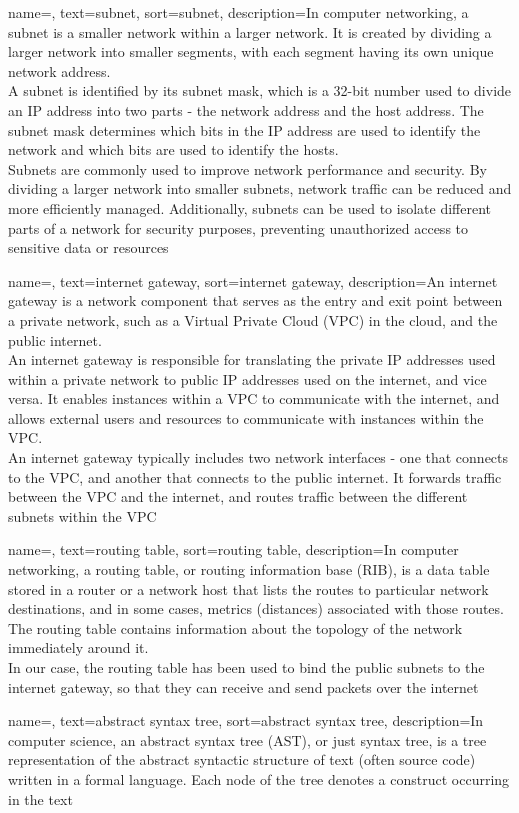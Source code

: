 {
    name=,
    text=subnet,
    sort=subnet,
    description={In computer networking, a subnet is a smaller network within a larger network. It is created by dividing a larger network into smaller segments, with each segment having its own unique network address.\\
    A subnet is identified by its subnet mask, which is a 32-bit number used to divide an IP address into two parts - the network address and the host address. The subnet mask determines which bits in the IP address are used to identify the network and which bits are used to identify the hosts.\\
    Subnets are commonly used to improve network performance and security. By dividing a larger network into smaller subnets, network traffic can be reduced and more efficiently managed. Additionally, subnets can be used to isolate different parts of a network for security purposes, preventing unauthorized access to sensitive data or resources}
}

{
    name=,
    text=internet gateway,
    sort=internet gateway,
    description={An internet gateway is a network component that serves as the entry and exit point between a private network, such as a Virtual Private Cloud (VPC) in the cloud, and the public internet.\\
    An internet gateway is responsible for translating the private IP addresses used within a private network to public IP addresses used on the internet, and vice versa. It enables instances within a VPC to communicate with the internet, and allows external users and resources to communicate with instances within the VPC.\\    
    An internet gateway typically includes two network interfaces - one that connects to the VPC, and another that connects to the public internet. It forwards traffic between the VPC and the internet, and routes traffic between the different subnets within the VPC}
}

{
    name=,
    text=routing table,
    sort=routing table,
    description={In computer networking, a routing table, or routing information base (RIB), is a data table stored in a router or a network host that lists the routes to particular network destinations, and in some cases, metrics (distances) associated with those routes. The routing table contains information about the topology of the network immediately around it.\\
    In our case, the routing table has been used to bind the public subnets to the internet gateway, so that they can receive and send packets over the internet}
}

{
    name=,
    text=abstract syntax tree,
    sort=abstract syntax tree,
    description={In computer science, an abstract syntax tree (AST), or just syntax tree, is a tree representation of the abstract syntactic structure of text (often source code) written in a formal language. Each node of the tree denotes a construct occurring in the text}
}